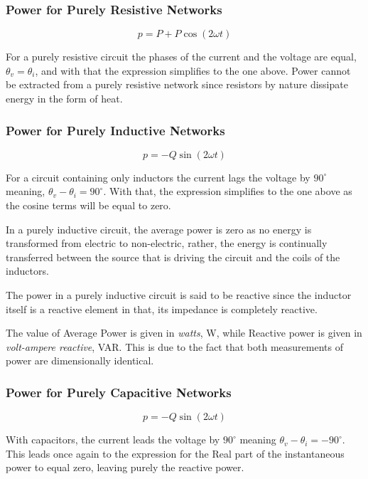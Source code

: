 \documentclass[12pt]{article}
\begin{document}
    \subsubsection*{Power for Purely Resistive Networks}
    \[
        p = P + P \cos (2 \omega t)
    \]
    \par For a purely resistive circuit the phases of the current and the
    voltage are equal, $\theta_{v} = \theta_{i}$, and with that the expression
    simplifies to the one above. Power cannot be extracted from a purely
    resistive network since resistors by nature dissipate energy in the form of
    heat.
    \subsubsection*{Power for Purely Inductive Networks}
    \[
        p = -Q \sin (2 \omega t)
    \]
    \par For a circuit containing only inductors the current lags the voltage by
    $90^{\circ}$ meaning, $\theta_{v} - \theta_{i} = 90^{\circ}$. With that, the
    expression simplifies to the one above as the cosine terms will be equal to
    zero.
    \par In a purely inductive circuit, the average power is zero as no energy
    is transformed from electric to non-electric, rather, the energy is
    continually transferred between the source that is driving the circuit and
    the coils of the inductors.
    \par The power in a purely inductive circuit is said to be reactive since
    the inductor itself is a reactive element in that, its impedance is
    completely reactive.
    \par The value of Average Power is given in \textit{watts}, W, while
    Reactive power is given in \textit{volt-ampere reactive}, VAR. This is due
    to the fact that both measurements of power are dimensionally identical.
    \subsubsection*{Power for Purely Capacitive Networks}
    \[
        p = -Q \sin (2 \omega t)
    \]
    \par With capacitors, the current leads the voltage by $90^{\circ}$ meaning
    $\theta_{v} - \theta_{i} = -90^{\circ}$. This leads once again to the
    expression for the Real part of the instantaneous power to equal zero,
    leaving purely the reactive power.
\end{document}
